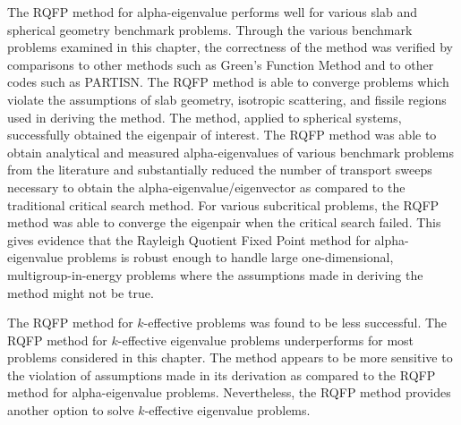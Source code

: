 The RQFP method for alpha-eigenvalue performs well for various slab and spherical geometry benchmark problems. Through the various benchmark problems examined in this chapter, the correctness of the method was verified by comparisons to other methods such as Green's Function Method and to other codes such as PARTISN. The RQFP method is able to converge problems which violate the assumptions of slab geometry, isotropic scattering, and fissile regions used in deriving the method. The method, applied to spherical systems, successfully obtained the eigenpair of interest. The RQFP method was able to obtain analytical and measured alpha-eigenvalues of various benchmark problems from the literature and substantially reduced the number of transport sweeps necessary to obtain the alpha-eigenvalue/eigenvector as compared to the traditional critical search method. For various subcritical problems, the RQFP method was able to converge the eigenpair when the critical search failed. This gives evidence that the Rayleigh Quotient Fixed Point method for alpha-eigenvalue problems is robust enough to handle large one-dimensional, multigroup-in-energy problems where the assumptions made in deriving the method might not be true.

The RQFP method for $k$-effective problems was found to be less successful. The RQFP method for $k$-effective eigenvalue problems underperforms for most problems considered in this chapter. The method appears to be more sensitive to the violation of assumptions made in its derivation as compared to the RQFP method for alpha-eigenvalue problems. 
Nevertheless, the RQFP method provides another option to solve $k$-effective eigenvalue problems.

%
